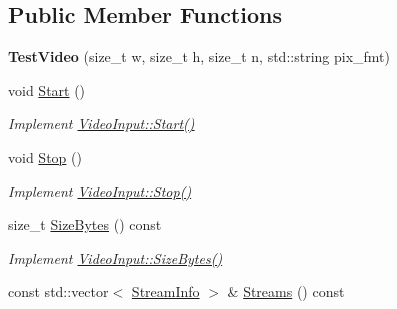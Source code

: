 \subsection*{Public Member Functions}
\begin{DoxyCompactItemize}
\item 
{\bfseries Test\+Video} (size\+\_\+t w, size\+\_\+t h, size\+\_\+t n, std\+::string pix\+\_\+fmt)\hypertarget{classpangolin_1_1_test_video_a105e38d101069bd5f517cc621dc26c23}{}\label{classpangolin_1_1_test_video_a105e38d101069bd5f517cc621dc26c23}

\item 
void \hyperlink{classpangolin_1_1_test_video_a2c27959ae2308b533d0eaa4adedfbb51}{Start} ()\hypertarget{classpangolin_1_1_test_video_a2c27959ae2308b533d0eaa4adedfbb51}{}\label{classpangolin_1_1_test_video_a2c27959ae2308b533d0eaa4adedfbb51}

\begin{DoxyCompactList}\small\item\em Implement \hyperlink{structpangolin_1_1_video_input_a74a2e3e1b87c7cbf9de9bcb39e1df128}{Video\+Input\+::\+Start()} \end{DoxyCompactList}\item 
void \hyperlink{classpangolin_1_1_test_video_aa162ae54699f6a5b9b861563ffe1cd64}{Stop} ()\hypertarget{classpangolin_1_1_test_video_aa162ae54699f6a5b9b861563ffe1cd64}{}\label{classpangolin_1_1_test_video_aa162ae54699f6a5b9b861563ffe1cd64}

\begin{DoxyCompactList}\small\item\em Implement \hyperlink{structpangolin_1_1_video_input_a8945f80194cc7ec9594db7f27e7d09b8}{Video\+Input\+::\+Stop()} \end{DoxyCompactList}\item 
size\+\_\+t \hyperlink{classpangolin_1_1_test_video_ab20b4f0d5e1ccdd7a6c40a82a894ed1b}{Size\+Bytes} () const \hypertarget{classpangolin_1_1_test_video_ab20b4f0d5e1ccdd7a6c40a82a894ed1b}{}\label{classpangolin_1_1_test_video_ab20b4f0d5e1ccdd7a6c40a82a894ed1b}

\begin{DoxyCompactList}\small\item\em Implement \hyperlink{structpangolin_1_1_video_input_a93cee5c33386973a2a51165e6bdcf40b}{Video\+Input\+::\+Size\+Bytes()} \end{DoxyCompactList}\item 
const std\+::vector$<$ \hyperlink{classpangolin_1_1_stream_info}{Stream\+Info} $>$ \& \hyperlink{classpangolin_1_1_test_video_ad04e6261b59630b90a2a1011280fb4f1}{Streams} () const \hypertarget{classpangolin_1_1_test_video_ad04e6261b59630b90a2a1011280fb4f1}{}\label{classpangolin_1_1_test_video_ad04e6261b59630b90a2a1011280fb4f1}


\end{DoxyCompactItemize}
